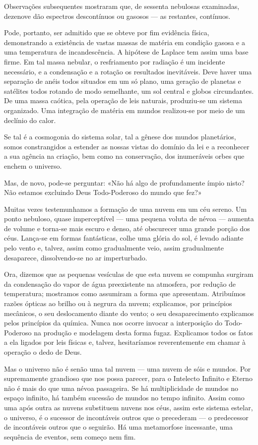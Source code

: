\documentclass[11pt,a5paper,twoside,openany]{book}
\begin{document}
Observações subsequentes mostraram que, de sessenta nebulosas examinadas, dezenove dão espectros descontínuos ou gasosos — as restantes, contínuos.

Pode, portanto, ser admitido que se obteve por fim evidência física, demonstrando a existência de vastas massas de matéria em condição gasosa e a uma temperatura de incandescência. A hipótese de Laplace tem assim uma base firme. Em tal massa nebular, o resfriamento por radiação é um incidente necessário, e a condensação e a rotação os resultados inevitáveis. Deve haver uma separação de anéis todos situados em um só plano, uma geração de planetas e satélites todos rotando de modo semelhante, um sol central e globos circundantes. De uma massa caótica, pela operação de leis naturais, produziu-se um sistema organizado. Uma integração de matéria em mundos realizou-se por meio de um declínio do calor.

Se tal é a cosmogonia do sistema solar, tal a gênese dos mundos planetários, somos constrangidos a estender as nossas vistas do domínio da lei e a reconhecer a sua agência na criação, bem como na conservação, dos inumeráveis orbes que enchem o universo.

Mas, de novo, pode-se perguntar: «Não há algo de profundamente ímpio nisto? Não estamos excluindo Deus Todo-Poderoso do mundo que fez?»

Muitas vezes testemunhamos a formação de uma nuvem em um céu sereno. Um ponto nebuloso, quase imperceptível — uma pequena voluta de névoa — aumenta de volume e torna-se mais escuro e denso, até obscurecer uma grande porção dos céus. Lança-se em formas fantásticas, colhe uma glória do sol, é levado adiante pelo vento e, talvez, assim como gradualmente veio, assim gradualmente desaparece, dissolvendo-se no ar imperturbado.

Ora, dizemos que as pequenas vesículas de que esta nuvem se compunha surgiram da condensação do vapor de água preexistente na atmosfera, por redução de temperatura; mostramos como assumiram a forma que apresentam. Atribuímos razões ópticas ao brilho ou à negrura da nuvem; explicamos, por princípios mecânicos, o seu deslocamento diante do vento; o seu desaparecimento explicamos pelos princípios da química. Nunca nos ocorre invocar a interposição do Todo-Poderoso na produção e modelagem desta forma fugaz. Explicamos todos os fatos a ela ligados por leis físicas e, talvez, hesitaríamos reverentemente em chamar à operação o dedo de Deus.

Mas o universo não é senão uma tal nuvem — uma nuvem de sóis e mundos. Por supremamente grandioso que nos possa parecer, para o Intelecto Infinito e Eterno não é mais do que uma névoa passageira. Se há multiplicidade de mundos no espaço infinito, há também sucessão de mundos no tempo infinito. Assim como uma após outra as nuvens substituem nuvens nos céus, assim este sistema estelar, o universo, é o sucessor de incontáveis outros que o precederam — o predecessor de incontáveis outros que o seguirão. Há uma metamorfose incessante, uma sequência de eventos, sem começo nem fim.
\end{document}
